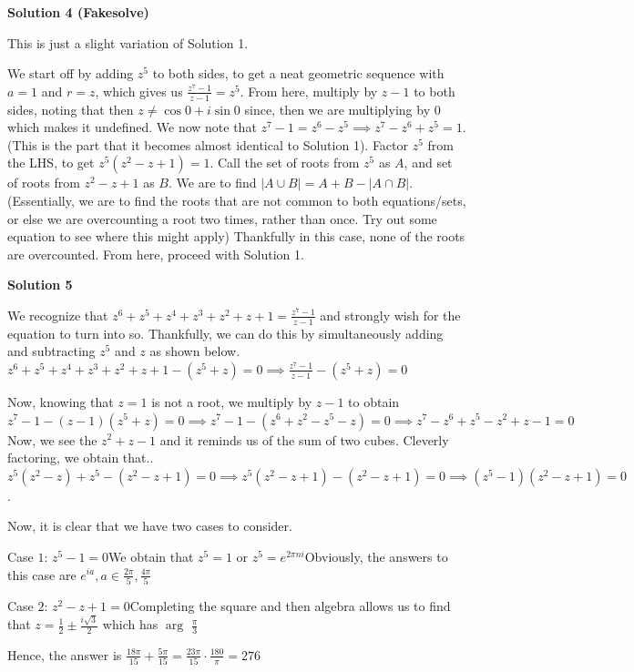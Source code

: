 \begin{enumerate}
\textbf{Solution 4 (Fakesolve)}

This is just a slight variation of Solution 1.

 We start off by adding $z^5$ to both sides, to get a neat geometric sequence with $a = 1$ and $r = z$, which gives us $\frac{z^7 - 1}{z - 1} = z^5$. From here, multiply by $z - 1$ to both sides, noting that then $z \neq \cos 0 + i\sin 0$ since, then we are multiplying by $0$ which makes it undefined. We now note that $z^7 - 1 = z^6 - z^5 \implies z^7 - z^6 + z^5 = 1$. (This is the part that it becomes almost identical to Solution 1). Factor $z^5$ from the LHS, to get $z^5( z^2 - z + 1) = 1$. Call the set of roots from $z^5$ as $A$, and set of roots from $z^2 - z + 1$ as $B$. We are to find $|A \cup B| = A + B - |A \cap B|$. (Essentially, we are to find the roots that are not common to both equations/sets, or else we are overcounting a root two times, rather than once. Try out some equation to see where this might apply) Thankfully in this case, none of the roots are overcounted. From here, proceed with Solution 1.

 



\textbf{Solution 5}

We recognize that $z^6+z^5+z^4+z^3+z^2+z+1=\frac{z^7-1}{z-1}$ and strongly wish for the equation to turn into so. Thankfully, we can do this by simultaneously adding and subtracting $z^5$ and $z$ as shown below.$z^6+z^5+z^4+z^3+z^2+z+1-(z^5+z)=0\implies \frac{z^7-1}{z-1}-(z^5+z)=0$

 Now, knowing that $z=1$ is not a root, we multiply by $z-1$ to obtain$z^7-1-(z-1)(z^5+z)=0\implies z^7-1-(z^6+z^2-z^5-z)=0\implies z^7-z^6+z^5-z^2+z-1=0$Now, we see the $z^2+z-1$ and it reminds us of the sum of two cubes. Cleverly factoring, we obtain that..$z^5(z^2-z)+z^5-(z^2-z+1)=0\implies z^5(z^2-z+1)-(z^2-z+1)=0\implies (z^5-1)(z^2-z+1)=0$. 

 Now, it is clear that we have two cases to consider.

 Case $1$: $z^5-1=0$We obtain that $z^5=1$ or $z^5=e^{2\pi{n}{i}}$Obviously, the answers to this case are $e^{ia}, a\in{\frac{2\pi}{5}, \frac{4\pi}{5}}$

 Case $2$: $z^2-z+1=0$Completing the square and then algebra allows us to find that $z=\frac{1}{2}\pm\frac{i\sqrt{3}}{2}$ which has $\arg$ $\frac{\pi}{3}$

 Hence, the answer is $\frac{18\pi}{15}+\frac{5\pi}{15}=\frac{23\pi}{15}\cdot\frac{180}{\pi}=\boxed{276}$





\end{enumerate}
